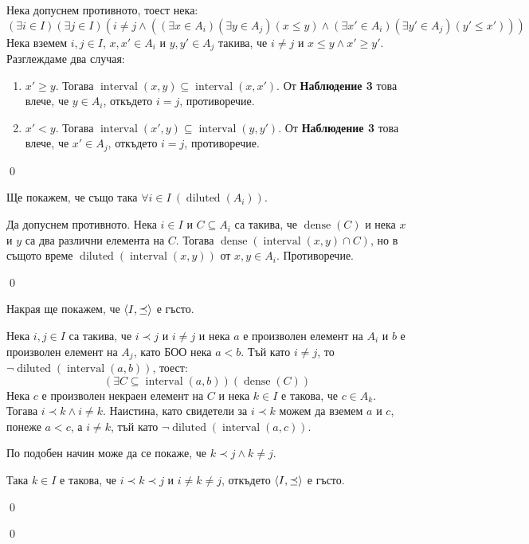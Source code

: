 \begin{problem}
\begin{tcolorbox}[mybox, title={Доказателство:}]
\quad
Нека допуснем противното, тоест нека:
\[
(\exists i \in I)(\exists j \in I)(i \neq j \land ((\exists x \in A_i)(\exists y \in A_j)(x \le y) \land (\exists x' \in A_i)(\exists y' \in A_j)(y' \le x')))
\]
\quad
Нека вземем $i, j \in I$, $x, x' \in A_i$ и $y, y' \in A_j$ такива, че $i \neq j$ и $x \le y \land x' \ge y'$. Разглеждаме два случая:
\begin{enumerate}[label={\arabic* сл.}]
\item
$x' \ge y$. Тогава $\operatorname{interval}(x, y) \subseteq \operatorname{interval}(x, x')$.
От \textbf{Наблюдение 3} това влече, че $y \in A_i$, откъдето $i = j$, противоречие.


\item
$x' < y$.
Тогава $\operatorname{interval}(x', y) \subseteq \operatorname{interval}(y, y')$.
От \textbf{Наблюдение 3} това влече, че $x' \in A_j$, откъдето $i = j$, противоречие.
\end{enumerate}

\qed
\end{tcolorbox}

\quad
Ще покажем, че също така $\forall i \in I\ (\operatorname{diluted}(A_i))$.
\begin{tcolorbox}[mybox, title={Доказателство:}]
\quad
Да допуснем противното. Нека $i \in I$ и $C \subseteq A_i$ са такива, че $\operatorname{dense}(C)$
и нека $x$ и $y$ са два различни елемента на $C$.
Тогава $\operatorname{dense}(\operatorname{interval}(x, y) \cap C)$,
но в същото време $\operatorname{diluted}(\operatorname{interval}(x, y))$ от
$x, y \in A_i$. Противоречие.

\qed
\end{tcolorbox}
\quad
Накрая ще покажем, че $\langle I, \preceq \rangle$ е гъсто.
\begin{tcolorbox}[mybox, title={Доказателство:}]
\quad
Нека $i, j \in I$ са такива, че $i \prec j$ и $i \neq j$ и нека $a$ е произволен елемент на $A_i$ и $b$ е произволен елемент на $A_j$,
като БОО нека $a < b$.
Тъй като $i \neq j$, то $\neg \operatorname{diluted}(\operatorname{interval}(a, b))$, тоест:
\[
(\exists C \subseteq \operatorname{interval}(a, b)) (\operatorname{dense}(C))
\]
\quad
Нека $c$ е произволен некраен елемент на $C$ и нека $k \in I$ е такова, че $c \in A_k$.
Тогава $i \prec k \land i \neq k$.
Наистина, като свидетели за $i \prec k$ можем да вземем $a$ и $c$, понеже $a < c$,
а $i \neq k$, тъй като $\neg \operatorname{diluted}(\operatorname{interval}(a, c))$.

\quad
По подобен начин може да се покаже, че $k \prec j \land k \neq j$.

\quad
Така $k \in I$ е такова, че $i \prec k \prec j$ и $i \neq k \neq j$, откъдето $\langle I, \preceq \rangle$ е гъсто.

\qed
\end{tcolorbox}

\qed

\end{problem}
